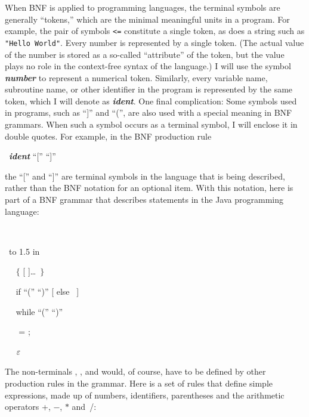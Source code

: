 When BNF is applied to programming languages, the terminal symbols
are generally ``tokens,'' which are the minimal meaningful units in
a program.  For example, the pair of symbols \verb?<=? constitute a
single token, as does a string such as \texttt{"Hello World"}.
Every number is represented by a single token.  (The actual value
of the number is stored as a so-called ``attribute'' of the token,
but the value plays no role in the context-free syntax of the
language.) I will use the
symbol \textbf{\textsl{number}} to represent a numerical token.
Similarly, every variable name, subroutine name, or other identifier
in the program is represented by the same token, which I will denote
as \textbf{\textsl{ident}}.  One final complication:  Some symbols
used in programs, such as ``]'' and ``('', are also used with
a special meaning in BNF grammars.  When such a symbol occurs as
a terminal symbol, I will enclose it in double quotes.  For
example, in the BNF production rule

\smallskip
\centerline{  \BNFPRODUCES\ 
   \textbf{\textsl{ident}} ``[''  ``]'' }

\smallskip
\noindent the ``['' and ``]'' are terminal symbols in the language
that is being described, rather than the BNF notation for an
optional item.  With this notation, here is part of a BNF
grammar that describes statements in the Java programming
language:

\smallskip

\  \BNFPRODUCES\  \BNFALT\ 
                                    \BNFALT\ \NT{while-statement}
 
\ \hbox to 1.5 in{} \BNFALT\  \BNFALT\ 
\smallskip

\  \BNFPRODUCES\ $\{$ [  ]\dots\ $\}$
\smallskip

\  \BNFPRODUCES\ if ``(''  ``)''  [ else ~]
\smallskip

\  \BNFPRODUCES\ while ``(''  ``)'' 
\smallskip

\  \BNFPRODUCES\  =  ;
\smallskip

\  \BNFPRODUCES\ $\varepsilon$

\smallskip

\noindent The non-terminals , , and 
 would, of course, have to be defined by other
production rules in the grammar.  Here is a set of rules that
define simple expressions, made up of numbers, identifiers,
parentheses and the arithmetic operators +, $-$, $*$ and~/:

